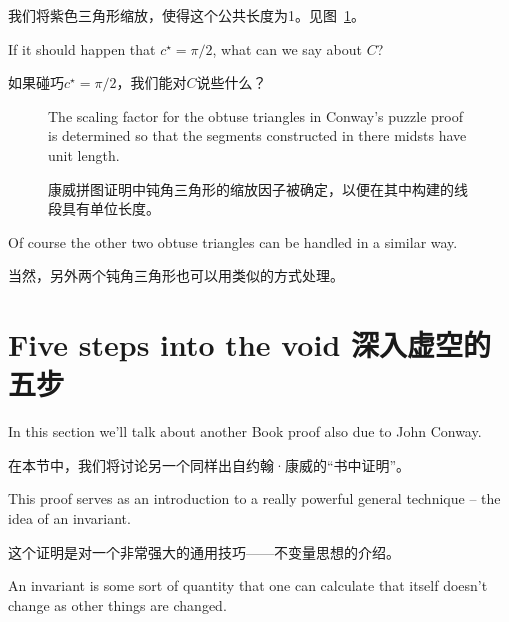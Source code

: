 我们将紫色三角形缩放，使得这个公共长度为1。见图~\ref{fig:morley_conway_puzzle_scaling}。

\begin{exer}
If it should happen that $c^\star = \pi/2$, what can we 
say about $C$?
\end{exer}

\begin{exer}
如果碰巧$c^\star = \pi/2$，我们能对$C$说些什么？
\end{exer}

\begin{figure}[!hbtp] 
\begin{center}

\end{center}
\caption[Scaling in Conway's puzzle proof.]{The scaling factor for
the obtuse triangles in Conway's puzzle proof is determined so that 
the segments constructed in there midsts have unit length.}
\caption[康威拼图证明中的缩放。]{康威拼图证明中钝角三角形的缩放因子被确定，以便在其中构建的线段具有单位长度。}
\label{fig:morley_conway_puzzle_scaling}
\end{figure}
 
Of course the other two obtuse triangles can be handled in a similar way.

当然，另外两个钝角三角形也可以用类似的方式处理。

\clearpage





\newpage

\section{Five steps into the void 深入虚空的五步}
\label{sec:5_steps}

In this section we'll talk about another Book proof also due to John
Conway.

在本节中，我们将讨论另一个同样出自约翰·康威的“书中证明”。

This proof serves as an introduction to a really powerful
general technique -- the idea of an invariant.

这个证明是对一个非常强大的通用技巧——不变量思想的介绍。

An invariant is some
sort of quantity that one can calculate that itself doesn't change as 
other things are changed.

